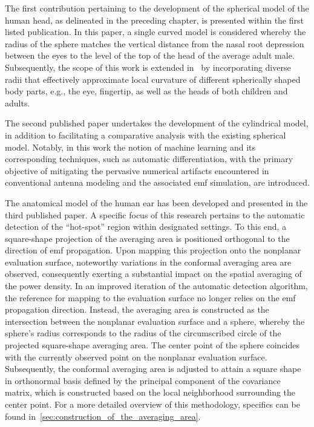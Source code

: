 The first contribution pertaining to the development of the spherical model of the human head, as delineated in the preceding chapter, is presented within the first listed publication.
In this paper, a single curved model is considered whereby the radius of the sphere matches the vertical distance from the nasal root depression between the eyes to the level of the top of the head of the average adult male.
Subsequently, the scope of this work is extended in~\cite{Kapetanovic2022HoloLens} by incorporating diverse radii that effectively approximate local curvature of different spherically shaped body parts, e.g., the eye, fingertip, as well as the heads of both children and adults.

The second published paper undertakes the development of the cylindrical model, in addition to facilitating a comparative analysis with the existing spherical model.
Notably, in this work the notion of machine learning and its corresponding techniques, such as automatic differentiation, with the primary objective of mitigating the pervasive numerical artifacts encountered in conventional antenna modeling and the associated \gls{emf} simulation, are introduced.

The anatomical model of the human ear has been developed and presented in the third published paper.
A specific focus of this research pertains to the automatic detection of the ``hot-spot'' region within designated settings.
To this end, a square-shape projection of the averaging area is positioned orthogonal to the direction of \gls{emf} propagation.
Upon mapping this projection onto the nonplanar evaluation surface, noteworthy variations in the conformal averaging area are observed, consequently exerting a substantial impact on the spatial averaging of the power density.
In an improved iteration of the automatic detection algorithm, the reference for mapping to the evaluation surface no longer relies on the \gls{emf} propagation direction.
Instead, the averaging area is constructed as the intersection between the nonplanar evaluation surface and a sphere, whereby the sphere's radius corresponds to the radius of the circumscribed circle of the projected square-shape averaging area.
The center point of the sphere coincides with the currently observed point on the nonplanar evaluation surface.
Subsequently, the conformal averaging area is adjusted to attain a square shape in orthonormal basis defined by the principal component of the covariance matrix, which is constructed based on the local neighborhood surrounding the center point.
For a more detailed overview of this methodology, specifics can be found in~\cref{sec:construction_of_the_averaging_area}.

